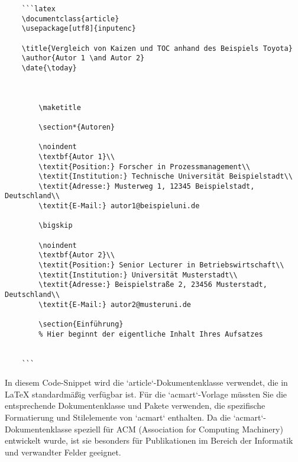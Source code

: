 \begin{verbatim}
	```latex
	\documentclass{article}
	\usepackage[utf8]{inputenc}
	
	\title{Vergleich von Kaizen und TOC anhand des Beispiels Toyota}
	\author{Autor 1 \and Autor 2}
	\date{\today}
	
	
		
		\maketitle
		
		\section*{Autoren}
		
		\noindent
		\textbf{Autor 1}\\
		\textit{Position:} Forscher in Prozessmanagement\\
		\textit{Institution:} Technische Universität Beispielstadt\\
		\textit{Adresse:} Musterweg 1, 12345 Beispielstadt, Deutschland\\
		\textit{E-Mail:} autor1@beispieluni.de
		
		\bigskip
		
		\noindent
		\textbf{Autor 2}\\
		\textit{Position:} Senior Lecturer in Betriebswirtschaft\\
		\textit{Institution:} Universität Musterstadt\\
		\textit{Adresse:} Beispielstraße 2, 23456 Musterstadt, Deutschland\\
		\textit{E-Mail:} autor2@musteruni.de
		
		\section{Einführung}
		% Hier beginnt der eigentliche Inhalt Ihres Aufsatzes
		
	
	```
\end{verbatim}

In diesem Code-Snippet wird die `article`-Dokumentenklasse verwendet, die in \LaTeX{} standardmäßig verfügbar ist. Für die `acmart`-Vorlage müssten Sie die entsprechende Dokumentenklasse und Pakete verwenden, die spezifische Formatierung und Stilelemente von `acmart` enthalten. Da die `acmart`-Dokumentenklasse speziell für ACM (Association for Computing Machinery) entwickelt wurde, ist sie besonders für Publikationen im Bereich der Informatik und verwandter Felder geeignet. 

